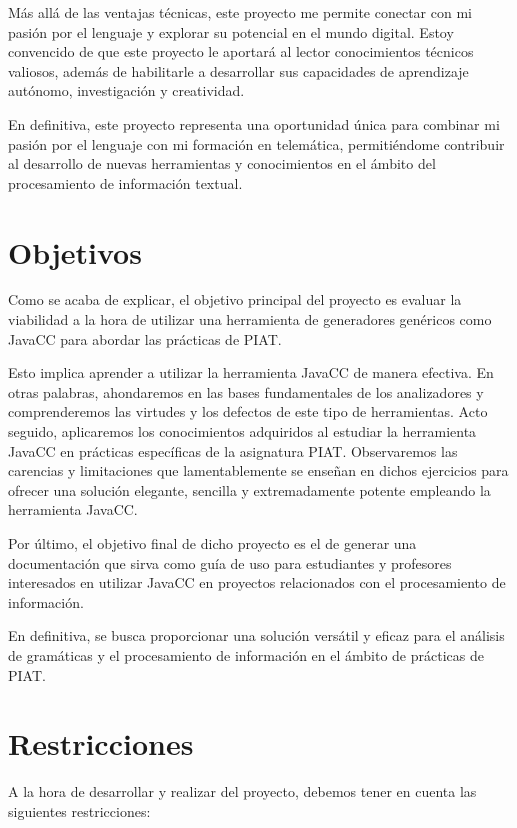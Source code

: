 Más allá de las ventajas técnicas, este proyecto me permite conectar con mi pasión por el lenguaje y explorar su potencial en el mundo digital. Estoy convencido de que este proyecto le aportará al lector conocimientos técnicos valiosos, además de habilitarle a desarrollar sus capacidades de aprendizaje autónomo, investigación y creatividad. 

En definitiva, este proyecto representa una oportunidad única para combinar mi pasión por el lenguaje con mi formación en telemática, permitiéndome contribuir al desarrollo de nuevas herramientas y conocimientos en el ámbito del procesamiento de información textual.

\section{Objetivos}

\noindent Como se acaba de explicar, el objetivo principal del proyecto es evaluar la viabilidad a la hora de utilizar una herramienta de generadores genéricos como JavaCC para abordar las prácticas de PIAT. 

Esto implica aprender a utilizar la herramienta JavaCC de manera efectiva. En otras palabras, ahondaremos en las bases fundamentales de los analizadores y comprenderemos las virtudes y los defectos de este tipo de herramientas. Acto seguido, aplicaremos los conocimientos adquiridos al estudiar la herramienta JavaCC en prácticas específicas de la asignatura PIAT. Observaremos las carencias y limitaciones que lamentablemente se enseñan en dichos ejercicios para ofrecer una solución elegante, sencilla y extremadamente potente empleando la herramienta JavaCC.


Por último, el objetivo final de dicho proyecto es el de generar una documentación que sirva como guía de uso para estudiantes y profesores interesados en utilizar JavaCC en proyectos relacionados con el procesamiento de información. 

En definitiva, se busca proporcionar una solución versátil y eficaz para el análisis de gramáticas y el procesamiento de información en el ámbito de prácticas de PIAT.

\section{Restricciones}

\noindent A la hora de desarrollar y realizar del proyecto, debemos tener en cuenta las siguientes restricciones:

